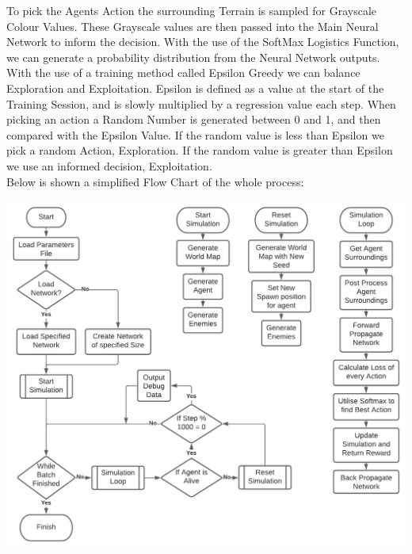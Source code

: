 \begin{flushleft}
            To pick the Agents Action the surrounding Terrain is sampled for Grayscale Colour Values. These Grayscale values are then 
            passed into the Main Neural Network to inform the decision. With the use of the SoftMax Logistics Function, we can generate a 
            probability distribution from the Neural Network outputs. \\
            \vspace{0.2cm}
            With the use of a training method called Epsilon Greedy we can balance Exploration and Exploitation. Epsilon is defined as
            a value at the start of the Training Session, and is slowly multiplied by a regression value each step. When picking an action
            a Random Number is generated between 0 and 1, and then compared with the Epsilon Value. If the random value is less than Epsilon
            we pick a random Action, Exploration. If the random value is greater than Epsilon we use an informed decision, Exploitation. \\
            \vspace{0.2cm}
            Below is shown a simplified Flow Chart of the whole process: \\
            
            \vspace{0.5cm}
            \centerline{\includegraphics[width=\textwidth]{Images/Design/NEAFlowChart.png}}
            \vspace{0.5cm}

\end{flushleft}
